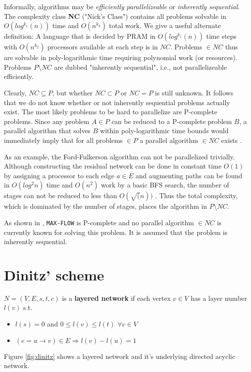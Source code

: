 \documentclass[a4paper,10pt, twocolumn]{article}
\begin{document}
Informally, algorithms may be \emph{efficiently parallelizeable} or \emph{inherently sequential}. The complexity class \textbf{NC} \cite{papa95} ("Nick's Class") contains all problems solvable in $O(log^{k_1}(n))$ time and $O(n^{k_2})$ total work. We give a useful alternate definition:  A language that is decided by PRAM in $O(log^{k_1}(n))$ time steps with $O(n^{k_2})$ processors available at each step is in $NC$. Problems $\in NC$ thus are solvable  in poly-logarithmic time requiring polynomial work (or resources). Problems $P \setminus NC$ are dubbed "inherently sequential", i.e., not parallelizeable efficiently. 

Clearly, $NC \subseteq P$, but whether $NC \subset P$ or $NC = P$ is still unknown. It follows that we do not know whether or not inherently sequential problems actually exist. The most likely problems to be hard to parallelize are P-complete problems. Since any problem $A \in P$ can be reduced to a P-complete problem $B$, a parallel algorithm that solves $B$ within poly-logarithmic time bounds would immediately imply that for all problems $\in P$ a parallel algorithm $\in NC$ exists \cite{papa95}.

As an example, the Ford-Fulkerson algorithm can not be parallelized trivially. Although constructing the residual network can be done in constant time $O(1)$ by assigning a processor to each edge $a \in E$ and augmenting paths can be found in $O(log^{2}n)$ time and $O(n^{2})$ work by a basic BFS search, the number of stages can not be reduced to less than $O(\sqrt(n))$ \cite{ahuja93}. Thus the total complexity, which is dominated by the number of stages, places the algorithm in $P \setminus NC$.
	
As shown in \cite{papa95}, \lstinline|MAX-FLOW| is P-complete and no parallel algorithm $\in NC$ is currently known for solving this problem. It is assumed that the problem is inherently sequential.

\section{Dinitz' scheme}
\label{sec:dinitz}
$N = (V,E,s,t,c)$ is a \textbf{layered network} \cite{yossi81} if each vertex $v \in V$ has a layer number $l(v)$ s.t.
\begin{itemize}
	\item $l(s) = 0$ and $0 \leq l(v) \leq l(t)$ $\forall v \in V$
	\item $(e = u \rightarrow v) \in E  \Rightarrow l(v) - l(u) = 1$
\end{itemize}
Figure \ref{fig:dinitz} shows a layered network and it's underlying directed acyclic network.
\end{document}

